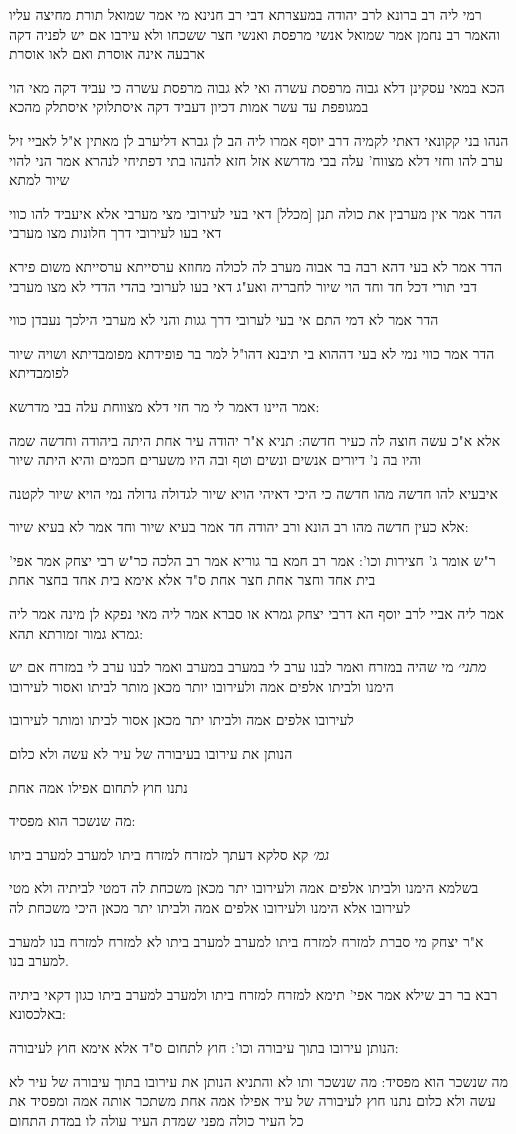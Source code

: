 \documentclass[12pt, openany]{book}
\newcommand{\sethebfont}{
\fontsize{10.5pt}{21.0pt} \selectfont
}
\newcommand{\textblock}[1]{
{\sethebfont #1\\}	
}
\begin{document}
\textblock{רמי ליה רב ברונא לרב יהודה במעצרתא דבי רב חנינא מי אמר שמואל תורת מחיצה עליו והאמר רב נחמן אמר שמואל אנשי מרפסת ואנשי חצר ששכחו ולא עירבו אם יש לפניה דקה ארבעה אינה אוסרת ואם לאו אוסרת}
\textblock{הכא במאי עסקינן דלא גבוה מרפסת עשרה ואי לא גבוה מרפסת עשרה כי עביד דקה מאי הוי במגופפת עד עשר אמות דכיון דעביד דקה איסתלוקי איסתלק מהכא}
\textblock{הנהו בני קקונאי דאתי לקמיה דרב יוסף אמרו ליה הב לן גברא דליערב לן מאתין א"ל לאביי זיל ערב להו וחזי דלא מצווח' עלה בבי מדרשא אזל חזא להנהו בתי דפתיחי לנהרא אמר הני להוי שיור למתא}
\textblock{הדר אמר אין מערבין את כולה תנן [מכלל] דאי בעי לעירובי מצי מערבי אלא איעביד להו כווי דאי בעו לעירובי דרך חלונות מצו מערבי}
\textblock{הדר אמר לא בעי דהא רבה בר אבוה מערב לה לכולה מחוזא ערסייתא ערסייתא משום פירא דבי תורי דכל חד וחד הוי שיור לחבריה ואע"ג דאי בעו לערובי בהדי הדדי לא מצו מערבי}
\textblock{הדר אמר לא דמי התם אי בעי לערובי דרך גגות והני לא מערבי הילכך נעבדן כווי }
\textblock{הדר אמר כווי נמי לא בעי דההוא בי תיבנא דהו"ל למר בר פופידתא מפומבדיתא ושויה שיור לפומבדיתא}
\textblock{אמר היינו דאמר לי מר חזי דלא מצווחת עלה בבי מדרשא:}
\textblock{אלא א"כ עשה חוצה לה כעיר חדשה: תניא א"ר יהודה עיר אחת היתה ביהודה וחדשה שמה והיו בה נ' דיורים אנשים ונשים וטף ובה היו משערים חכמים והיא היתה שיור}
\textblock{איבעיא להו חדשה מהו חדשה כי היכי דאיהי הויא שיור לגדולה גדולה נמי הויא שיור לקטנה}
\textblock{אלא כעין חדשה מהו רב הונא ורב יהודה חד אמר בעיא שיור וחד אמר לא בעיא שיור:}
\textblock{ר"ש אומר ג' חצירות וכו': אמר רב חמא בר גוריא אמר רב הלכה כר"ש רבי יצחק אמר אפי' בית אחד וחצר אחת חצר אחת ס"ד אלא אימא בית אחד בחצר אחת}
\textblock{אמר ליה אביי לרב יוסף הא דרבי יצחק גמרא או סברא אמר ליה מאי נפקא לן מינה אמר ליה גמרא גמור זמורתא תהא:}
\textblock{{\large\emph{מתני׳}} מי שהיה במזרח ואמר לבנו ערב לי במערב במערב ואמר לבנו ערב לי במזרח אם יש הימנו ולביתו אלפים אמה ולעירובו יותר מכאן מותר לביתו ואסור לעירובו}
\textblock{לעירובו אלפים אמה ולביתו יתר מכאן אסור לביתו ומותר לעירובו}
\textblock{הנותן את עירובו בעיבורה של עיר לא עשה ולא כלום}
\textblock{נתנו חוץ לתחום אפילו אמה אחת}
\textblock{מה שנשכר הוא מפסיד:}
\textblock{{\large\emph{גמ׳}} קא סלקא דעתך למזרח למזרח ביתו למערב למערב ביתו}
\textblock{בשלמא הימנו ולביתו אלפים אמה ולעירובו יתר מכאן משכחת לה דמטי לביתיה ולא מטי לעירובו אלא הימנו ולעירובו אלפים אמה ולביתו יתר מכאן היכי משכחת לה}
\textblock{א"ר יצחק מי סברת למזרח למזרח ביתו למערב למערב ביתו לא למזרח למזרח בנו למערב למערב בנו.}
\textblock{רבא בר רב שילא אמר אפי' תימא למזרח למזרח ביתו ולמערב למערב ביתו כגון דקאי ביתיה באלכסונא:}
\textblock{הנותן עירובו בתוך עיבורה וכו': חוץ לתחום ס"ד אלא אימא חוץ לעיבורה:}
\textblock{מה שנשכר הוא מפסיד: מה שנשכר ותו לא והתניא הנותן את עירובו בתוך עיבורה של עיר לא עשה ולא כלום נתנו חוץ לעיבורה של עיר אפילו אמה אחת משתכר אותה אמה ומפסיד את כל העיר כולה מפני שמדת העיר עולה לו במדת התחום}
\end{document}

